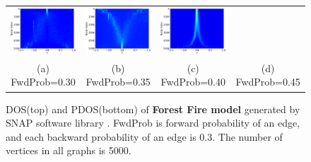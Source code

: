 \documentclass[senior,final,11pt]{iscs-thesis}
\begin{document}
\begin{figure}[htbp]
\begin{tabular}{cccc}
    \includegraphics[width=45mm]{figure/forest_fire_5000_035_030txt_pdos.png} &
    \includegraphics[width=45mm]{figure/forest_fire_5000_040_030txt_pdos.png} &
    \includegraphics[width=45mm]{figure/forest_fire_5000_045_030txt_pdos.png} \\
    (a) FwdProb=0.30 & (b) FwdProb=0.35 & (c) FwdProb=0.40 & (d) FwdProb=0.45\\ [6pt]
  \end{tabular}
  \caption{DOS(top) and PDOS(bottom) of {\bf Forest Fire model} \cite{leskovec2007graph} generated by SNAP software library \cite{leskovec2016snap}. FwdProb is forward probability of an edge, and each backward probability of an edge is 0.3. The number of vertices in all graphs is 5000.}
  \label{fig:forest_fire}
\end{figure}
\end{document}
